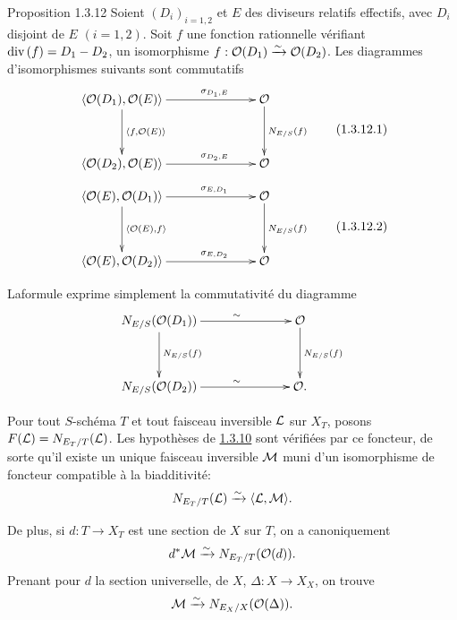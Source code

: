 \documentclass[10pt]{../fichiers-configuration-latex/smfart}
\begin{document}
\begin{enonce*}{Proposition 1.3.12}
Soient $(D_{i})_{i=1,2}$ et $E$ des diviseurs relatifs effectifs, avec
$D_{i}$ disjoint de $E$ $(i=1,2)$. Soit $f$ une fonction rationnelle
vérifiant $\text{\rm div\,}(f)=D_{1}-D_{2}$, \ie un isomorphisme
$f:{\mathcal O}(D_{1})\xrightarrow{\sim}{\mathcal O}(D_{2})$. Les diagrammes
d'isomorphismes suivants sont commutatifs
\begin{equation*}
\vcenter{
\xymatrix@C=2.5cm@R=1.25cm{
\langle \Oo(D_1), \Oo(E)\rangle   \ar[d]^{\langle f,\Oo(E)\rangle } \ar[r]^(.65){\sigma_{D_{1},E}} & \Oo\ar[d]^{N_{E/S}(f)}\\
\langle \Oo(D_2),\Oo(E)\rangle    \ar[r]^(.65){\sigma_{D_{2},E}} & \Oo
}}\tag{1.3.12.1}
\end{equation*}
\begin{equation*}
\vcenter{
\xymatrix@C=2.5cm@R=1.25cm{
\langle \Oo(E), \Oo(D_1)\rangle   \ar[d]^{\langle \Oo(E),f\rangle } \ar[r]^(.65){\sigma_{E,D_{1}}} & \Oo\ar[d]^{N_{E/S}(f)}\\
\langle \Oo(E),\Oo(D_2)\rangle    \ar[r]^(.65){\sigma_{E,D_{2}}} & \Oo
}}\tag{1.3.12.2}
\end{equation*}
\end{enonce*}

La\pageoriginale formule  exprime simplement la
commutativité du diagramme
$$
\xymatrix@C=2.5cm@R=1.25cm{
N_{E/S}(\Oo(D_1))  \ar[r]^(.55){\sim} \ar[d]^{N_{E/S}(f)} & \Oo \ar[d]^{N_{E/S}(f)} \\         
N_{E/S}(\Oo(D_2))  \ar[r]^(.55){\sim} & \Oo.
}
$$

Pour tout $S$-schéma $T$ et tout faisceau inversible ${\mathcal L}$ sur
$X_{T}$, posons $F({\mathcal L})=N_{E_{T}/T}({\mathcal L})$. Les
hypothèses de \hyperref[XVIII.thm1.3.10]{1.3.10} sont vérifiées par ce foncteur, de
sorte qu'il existe un unique faisceau inversible ${\mathcal M}$ muni d'un
isomorphisme de foncteur compatible à la biadditivité:
$$
N_{E_{T}/T}({\mathcal L})\xrightarrow{\sim}\langle {\mathcal L},{\mathcal M}\rangle {}.
$$

De plus, si $d:T\rightarrow X_{T}$ est une section de $X$ sur $T$, on
a canoniquement
$$
d^{\ast}{\mathcal M}\xrightarrow{\sim} N_{E_{T}/T}({\mathcal O}(d)){}.
$$
Prenant pour $d$ la section universelle, de $X$, $\Delta:X\rightarrow
X_{X}$, on trouve 
$$
{\mathcal M}\xrightarrow{\sim} N_{E_{X}/X}({\mathcal O}(\Delta)){}.
$$
\end{document}
